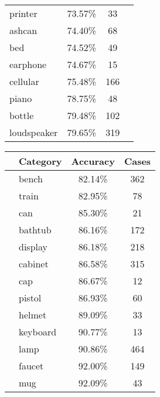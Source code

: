 \begin{table}[]
\begin{tabular}[t]{lccl}
		printer           & 73.57\%           & 33             &              \\
		ashcan            & 74.40\%           & 68             &              \\
		bed               & 74.52\%           & 49             &              \\
		earphone          & 74.67\%           & 15             &              \\
		cellular          & 75.48\%           & 166            &              \\
		piano             & 78.75\%           & 48             &              \\
		bottle            & 79.48\%           & 102            &              \\
		loudspeaker       & 79.65\%           & 319            &              \\ \hline
	\end{tabular}
	\begin{tabular}[t]{llcc}
		\hline
		\hspace{4pt} & \textbf{Category} & \textbf{Accuracy} & \textbf{Cases} \\ \hline
		             & bench             & 82.14\%           & 362            \\
		             & train             & 82.95\%           & 78             \\
		             & can               & 85.30\%           & 21             \\
		             & bathtub           & 86.16\%           & 172            \\
		             & display           & 86.18\%           & 218            \\
		             & cabinet           & 86.58\%           & 315            \\
		             & cap               & 86.67\%           & 12             \\
		             & pistol            & 86.93\%           & 60             \\
		             & helmet            & 89.09\%           & 33             \\
		             & keyboard          & 90.77\%           & 13             \\
		             & lamp              & 90.86\%           & 464            \\
		             & faucet            & 92.00\%           & 149            \\
		             & mug               & 92.09\%           & 43             \\

\end{tabular}
\end{table}
